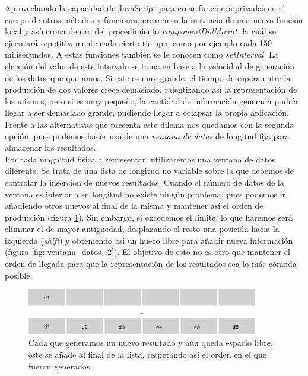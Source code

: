 \documentclass[../main.tex]{subfiles}
\begin{document}
Aprovechando la capacidad de JavaScript para crear funciones privadas en el cuerpo de otros métodos y funciones, crearemos la instancia de una nueva función local y asíncrona dentro del procedimiento \textit{componentDidMount}, la cuál se ejecutará repetitivamente cada cierto tiempo, como por ejemplo cada 150 milisegundos. A estas funciones también se le conocen como \textit{setInterval}. La elección del valor de este intervalo se toma en base a la velocidad de generación de los datos que queramos. Si este es muy grande, el tiempo de espera entre la producción de dos valores crece demasiado, ralentizando así la representación de los mismos; pero si es muy pequeño, la cantidad de información generada podría llegar a ser demasiado grande, pudiendo llegar a colapsar la propia aplicación. Frente a las alternativas que presenta este dilema nos quedamos con la segunda opción, pues podemos hacer uso de una \textit{ventana de datos} de longitud fija para almacenar los resultados.\\

Por cada magnitud física a representar, utilizaremos una ventana de datos diferente. Se trata de una lista de longitud no variable sobre la que debemos de controlar la inserción de nuevos resultados. Cuando el número de datos de la ventana es inferior a su longitud no existe ningún problema, pues podemos ir añadiendo otros  nuevos al final de la misma y mantener así el orden de producción (figura \ref{fig::ventana_datos_1}). Sin embargo, si excedemos el límite, lo que haremos será eliminar el de mayor antigüedad, desplazando el resto una posición hacia la izquierda (\textit{shift}) y obteniendo así un hueco libre para añadir nueva información (figura \ref{fig::ventana_datos_2}). El objetivo de esto no es otro que mantener el orden de llegada para que la representación de los resultados sea lo más cómoda posible. \\


\begin{figure}[!h]
    \centering
    \includegraphics[width=0.9\textwidth]{images/ventana_datos_1.png}
    \caption{Cada que generamos un nuevo resultado y aún queda espacio libre, este se añade al final de la lista, respetando así el orden en el que fueron generados.}
    \label{fig::ventana_datos_1}
\end{figure}
\end{document}
